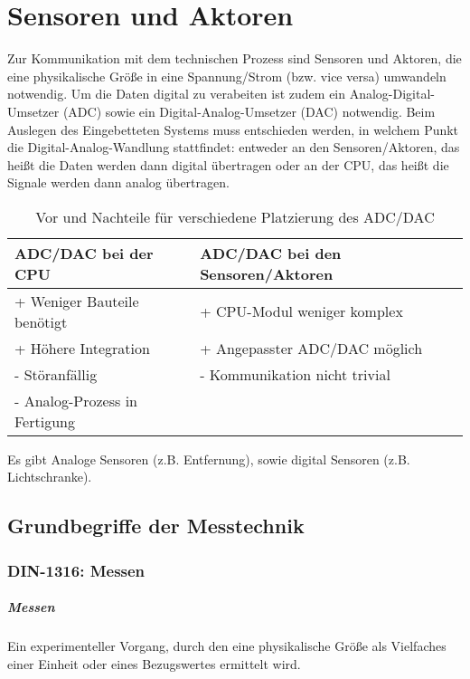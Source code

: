 \chapter{Sensoren und Aktoren}
Zur Kommunikation mit dem technischen Prozess sind Sensoren und Aktoren, die eine physikalische Größe in eine Spannung/Strom (bzw. vice versa) umwandeln notwendig.
Um die Daten digital zu verabeiten ist zudem ein Analog-Digital-Umsetzer (ADC) sowie ein Digital-Analog-Umsetzer (DAC) notwendig.
Beim Auslegen des Eingebetteten Systems muss entschieden werden, in welchem Punkt die Digital-Analog-Wandlung stattfindet: entweder an den Sensoren/Aktoren, das
heißt die Daten werden dann digital übertragen oder an der CPU, das heißt die Signale werden dann analog übertragen.

\begin{table}[H]
    \centering
    \begin{tabular}{p{}p{}}
        \toprule
        ADC/DAC bei der CPU & ADC/DAC bei den Sensoren/Aktoren \\
        \midrule
        + Weniger Bauteile benötigt & + CPU-Modul weniger komplex \\
        + Höhere Integration & + Angepasster ADC/DAC möglich \\
        - Störanfällig & - Kommunikation nicht trivial \\
        - Analog-Prozess in Fertigung & \\
        \bottomrule
    \end{tabular}
    \caption{Vor und Nachteile für verschiedene Platzierung des ADC/DAC}
\end{table}

Es gibt Analoge Sensoren (z.B. Entfernung), sowie digital Sensoren (z.B. Lichtschranke).

\section{Grundbegriffe der Messtechnik}
\subsection{DIN-1316: Messen}
\paragraph{Messen} 
Ein experimenteller Vorgang, durch den eine physikalische Größe als Vielfaches einer Einheit oder eines Bezugswertes ermittelt wird.

